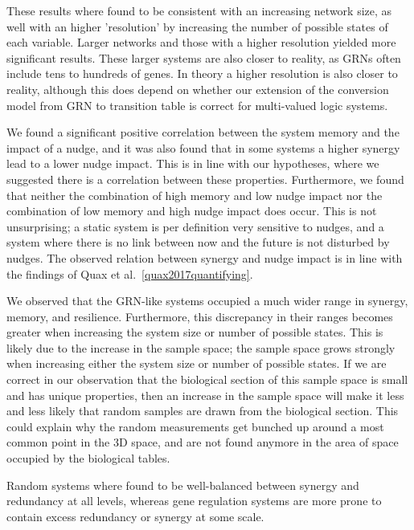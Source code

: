 \documentclass[../main.tex]{subfiles}
\begin{document}
These results where found to be consistent with an increasing network size, as well with an higher 'resolution' by increasing the number of possible states of each variable.
Larger networks and those with a higher resolution yielded more significant results.
These larger systems are also closer to reality, as GRNs often include tens to hundreds of genes.
In theory a higher resolution is also closer to reality, although this does depend on whether our extension of the conversion model from GRN to transition table is correct for multi-valued logic systems.

We found a significant positive correlation between the system memory and the impact of a nudge, and it was also found that in some systems a higher synergy lead to a lower nudge impact.
This is in line with our hypotheses, where we suggested there is a correlation between these properties.
Furthermore, we found that neither the combination of high memory and low nudge impact nor the combination of low memory and high nudge impact does occur.
This is not unsurprising; a static system is per definition very sensitive to nudges, and a system where there is no link between now and the future is not disturbed by nudges.
The observed relation between synergy and nudge impact is in line with the findings of Quax et al.~\ref{quax2017quantifying}.

We observed that the GRN-like systems occupied a much wider range in synergy, memory, and resilience.
Furthermore, this discrepancy in their ranges becomes greater when increasing the system size or number of possible states.
This is likely due to the increase in the sample space; the sample space grows strongly when increasing either the system size or number of possible states.
If we are correct in our observation that the biological section of this sample space is small and has unique properties, then an increase in the sample space will make it less and less likely that random samples are drawn from the biological section.
This could explain why the random measurements get bunched up around a most common point in the 3D space, and are not found anymore in the area of space occupied by the biological tables.

Random systems where found to be well-balanced between synergy and redundancy at all levels, whereas gene regulation systems are more prone to contain excess redundancy or synergy at some scale.
\end{document}
